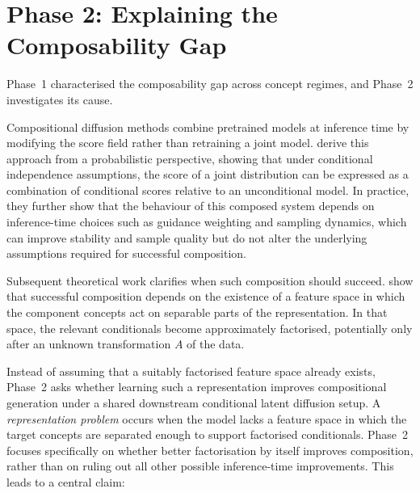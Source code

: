 
\section{Phase 2: Explaining the Composability Gap}
\label{sec:phase_2}

Phase~1 characterised the composability gap across concept regimes, and Phase~2 investigates its cause.

Compositional diffusion methods combine pretrained models at inference time by modifying the score field rather than retraining a joint model.
\citet{du2024compositional} derive this approach from a probabilistic perspective, showing that under conditional independence assumptions, the score of a joint distribution can be expressed as a combination of conditional scores relative to an unconditional model.
In practice, they further show that the behaviour of this composed system depends on inference-time choices such as guidance weighting and sampling dynamics, which can improve stability and sample quality but do not alter the underlying assumptions required for successful composition.

Subsequent theoretical work clarifies when such composition should succeed.
\citet{mechanisms2025projective} show that successful composition depends on the existence of a feature space in which the component concepts act on separable parts of the representation.
In that space, the relevant conditionals become approximately factorised, potentially only after an unknown transformation $A$ of the data.

Instead of assuming that a suitably factorised feature space already exists, Phase~2 asks whether
learning such a representation improves compositional generation under a shared downstream
conditional latent diffusion setup.
A \emph{representation problem} occurs when the model lacks a feature space in which the target concepts are separated enough to support factorised conditionals.
Phase~2 focuses specifically on whether better factorisation by itself improves composition, rather than on ruling out all other possible inference-time improvements.
This leads to a central claim:
\begin{center}
{\setlength{\fboxsep}{6pt}%
}
\end{center}

